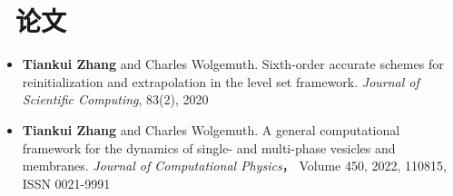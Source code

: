 \documentclass{resume}
\begin{document}
\section{\faBook\ 论文}
\begin{itemize}[parsep=0.5ex]
  \item \textbf{Tiankui Zhang} and Charles Wolgemuth. Sixth-order accurate schemes for reinitialization and extrapolation in the level set framework. \textit{Journal of Scientific Computing}, 83(2), 2020
  \item \textbf{Tiankui Zhang} and Charles Wolgemuth. A general computational framework for the dynamics of single- and multi-phase vesicles and membranes. \textit{Journal of Computational Physics}， Volume 450, 2022, 110815, ISSN 0021-9991
\end{itemize}



%
%
\end{document}
